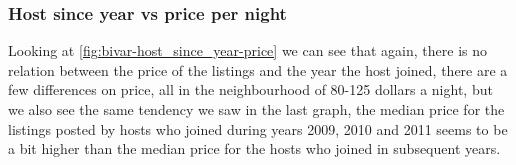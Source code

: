 \pagebreak
\subsubsection{Host since year vs price per night}


Looking at \cref{fig:bivar-host_since_year-price} we can see that again, there is no relation between the price of the listings and the year the host joined, there are a few differences on price, all in the neighbourhood of 80-125 dollars a night, but we also see the same tendency we saw in the last graph, the median price for the listings posted by hosts who joined during years 2009, 2010 and 2011 seems to be a bit higher than the median price for the hosts who joined in subsequent years.


\pagebreak

\label{sub:bivariate_analysis}


